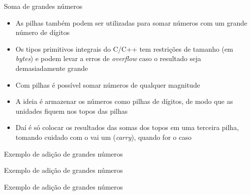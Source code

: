\begin{frame}[fragile]{Soma de grandes números}

    \begin{itemize}
        \item As pilhas também podem ser utilizadas para somar números com um grande número de
            dígitos

        \item Os tipos primitivos integrais do C/C++ tem restrições de tamanho (em \textit{bytes})
            e podem levar a erros de \textit{overflow} caso o resultado seja demasiadamente 
            grande

        \item Com pilhas é possível somar números de qualquer magnitude

        \item A ideia é armazenar os números como pilhas de dígitos, de modo que as unidades 
            fiquem nos topos das pilhas

        \item Daí é só colocar os resultados das somas dos topos em uma terceira pilha, tomando
            cuidado com o vai um (\textit{carry}), quando for o caso
    \end{itemize}

\end{frame}

\begin{frame}[fragile]{Exemplo de adição de grandes números}
\end{frame}

\begin{frame}[fragile]{Exemplo de adição de grandes números}
\end{frame}

\begin{frame}[fragile]{Exemplo de adição de grandes números}
\end{frame}
